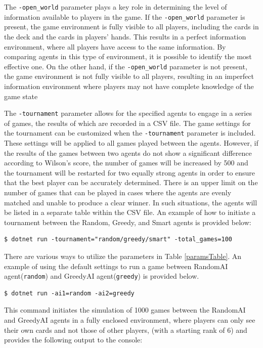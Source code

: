 The \texttt{-open\_world} parameter plays a key role in determining the level of information available to players in the game. If the \texttt{-open\_world} parameter is present, the game environment is fully visible to all players, including the cards in the deck and the cards in players' hands. This results in a perfect information environment, where all players have access to the same information. By comparing agents in this type of environment, it is possible to identify the most effective one. On the other hand, if the \texttt{-open\_world} parameter is not present, the game environment is not fully visible to all players, resulting in an imperfect information environment where players may not have complete knowledge of the game state

The \texttt{-tournament} parameter allows for the specified agents to engage in a series of games, the results of which are recorded in a CSV file. The game settings for the tournament can be customized when the \texttt{-tournament} parameter is included. These settings will be applied to all games played between the agents. However, if the results of the games between two agents do not show a significant difference according to Wilson's score, the number of games will be increased by 500 and the tournament will be restarted for two equally strong agents in order to ensure that the best player can be accurately determined. There is an upper limit on the number of games that can be played in cases where the agents are evenly matched and unable to produce a clear winner. In such situations, the agents will be listed in a separate table within the CSV file. An example of how to initiate a tournament between the Random, Greedy, and Smart agents is provided below:

\begin{lstlisting}
$ dotnet run -tournament="random/greedy/smart" -total_games=100
\end{lstlisting}

There are various ways to utilize the parameters in Table \ref{paramsTable}. An example of using the default settings to run a game between RandomAI agent(\texttt{random}) and GreedyAI agent(\texttt{greedy}) is provided below.

\begin{lstlisting}
$ dotnet run -ai1=random -ai2=greedy
\end{lstlisting}

This command initiates the simulation of 1000 games between the RandomAI and GreedyAI agents in a fully enclosed environment, where players can only see their own cards and not those of other players, (with a starting rank of 6) and provides the following output to the console:

